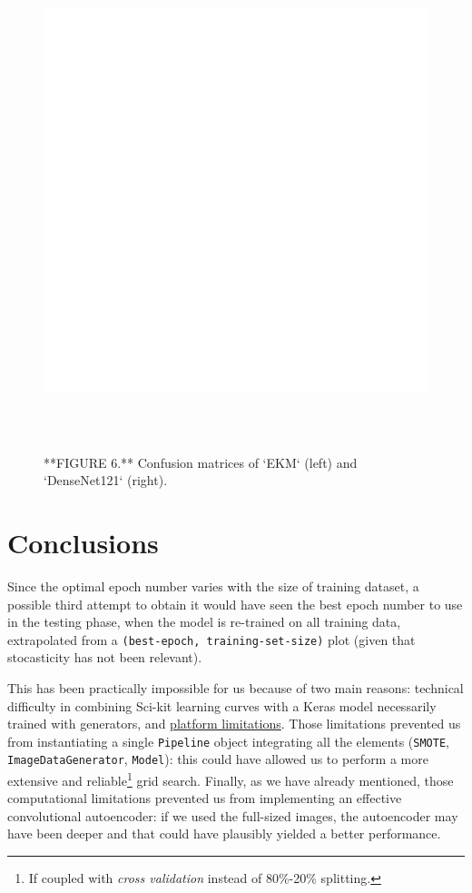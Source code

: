 \documentclass{acm_proc_article-sp}
\begin{document}
\begin{figure}

{\centering \includegraphics[width=800px,height=550]{ACM_files/figure-latex/confusion-matrices-1} 

}

\caption{**FIGURE 6.** Confusion matrices of `EKM` (left) and `DenseNet121` (right).}\label{fig:confusion-matrices}
\end{figure}

\hypertarget{conclusions}{%
\section{Conclusions}\label{conclusions}}

Since the optimal epoch number varies with the size of training dataset,
a possible third attempt to obtain it would have seen the best epoch
number to use in the testing phase, when the model is re-trained on all
training data, extrapolated from a
\texttt{(best-epoch,\ training-set-size)} plot (given that stocasticity
has not been relevant).

This has been practically impossible for us because of two main reasons:
technical difficulty in combining Sci-kit learning curves with a Keras
model necessarily trained with generators, and
\protect\hyperlink{limitations}{platform limitations}. Those limitations
prevented us from instantiating a single \texttt{Pipeline} object
integrating all the elements (\texttt{SMOTE},
\texttt{ImageDataGenerator}, \texttt{Model}): this could have allowed us
to perform a more extensive and reliable\footnote{If coupled with
  \emph{cross validation} instead of 80\%-20\% splitting.} grid search.
Finally, as we have already mentioned, those computational limitations
prevented us from implementing an effective convolutional autoencoder:
if we used the full-sized images, the autoencoder may have been deeper
and that could have plausibly yielded a better performance.
\end{document}
